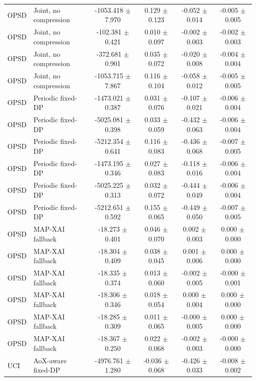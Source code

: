 \begin{table}[t]
\begin{tabular}{llcccc}
OPSD & Joint, no compression & -1053.418 $\pm$ 7.970 & 0.129 $\pm$ 0.123 & -0.052 $\pm$ 0.014 & -0.005 $\pm$ 0.005 \\
OPSD & Joint, no compression & -102.381 $\pm$ 0.421 & 0.010 $\pm$ 0.097 & -0.002 $\pm$ 0.003 & -0.002 $\pm$ 0.003 \\
OPSD & Joint, no compression & -372.681 $\pm$ 0.901 & 0.035 $\pm$ 0.072 & -0.020 $\pm$ 0.008 & -0.004 $\pm$ 0.004 \\
OPSD & Joint, no compression & -1053.715 $\pm$ 7.867 & 0.116 $\pm$ 0.104 & -0.058 $\pm$ 0.012 & -0.005 $\pm$ 0.005 \\
OPSD & Periodic fixed-DP & -1473.021 $\pm$ 0.387 & 0.031 $\pm$ 0.076 & -0.107 $\pm$ 0.021 & -0.006 $\pm$ 0.004 \\
OPSD & Periodic fixed-DP & -5025.081 $\pm$ 0.398 & 0.033 $\pm$ 0.059 & -0.432 $\pm$ 0.063 & -0.006 $\pm$ 0.004 \\
OPSD & Periodic fixed-DP & -5212.354 $\pm$ 0.641 & 0.116 $\pm$ 0.083 & -0.436 $\pm$ 0.068 & -0.007 $\pm$ 0.005 \\
OPSD & Periodic fixed-DP & -1473.195 $\pm$ 0.346 & 0.027 $\pm$ 0.083 & -0.118 $\pm$ 0.016 & -0.006 $\pm$ 0.004 \\
OPSD & Periodic fixed-DP & -5025.225 $\pm$ 0.313 & 0.032 $\pm$ 0.072 & -0.444 $\pm$ 0.049 & -0.006 $\pm$ 0.004 \\
OPSD & Periodic fixed-DP & -5212.651 $\pm$ 0.592 & 0.155 $\pm$ 0.065 & -0.449 $\pm$ 0.050 & -0.007 $\pm$ 0.005 \\
OPSD & MAP-XAI fallback & -18.273 $\pm$ 0.401 & 0.046 $\pm$ 0.070 & 0.002 $\pm$ 0.003 & 0.000 $\pm$ 0.000 \\
OPSD & MAP-XAI fallback & -18.304 $\pm$ 0.409 & 0.038 $\pm$ 0.045 & 0.001 $\pm$ 0.006 & 0.000 $\pm$ 0.000 \\
OPSD & MAP-XAI fallback & -18.335 $\pm$ 0.374 & 0.013 $\pm$ 0.060 & -0.002 $\pm$ 0.005 & -0.000 $\pm$ 0.001 \\
OPSD & MAP-XAI fallback & -18.306 $\pm$ 0.346 & 0.018 $\pm$ 0.054 & 0.000 $\pm$ 0.004 & 0.000 $\pm$ 0.000 \\
OPSD & MAP-XAI fallback & -18.285 $\pm$ 0.309 & 0.011 $\pm$ 0.065 & -0.000 $\pm$ 0.005 & 0.000 $\pm$ 0.000 \\
OPSD & MAP-XAI fallback & -18.367 $\pm$ 0.250 & 0.022 $\pm$ 0.068 & -0.002 $\pm$ 0.003 & -0.000 $\pm$ 0.000 \\
UCI & AoX-aware fixed-DP & -4976.761 $\pm$ 1.280 & -0.036 $\pm$ 0.068 & -0.426 $\pm$ 0.033 & -0.008 $\pm$ 0.002 \\

\end{tabular}
\end{table}
